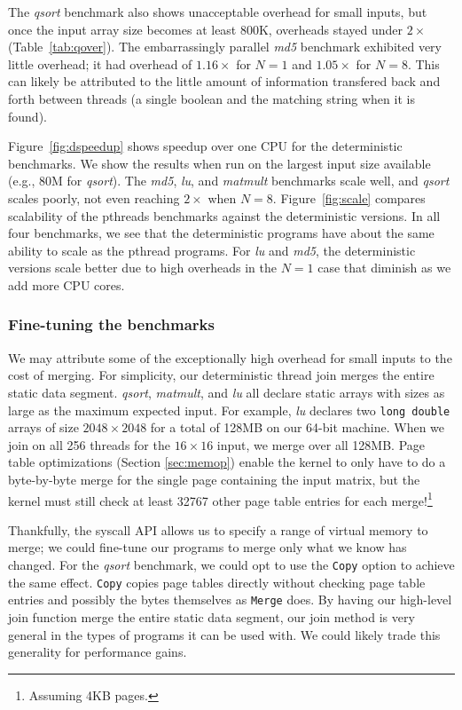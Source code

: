 The \emph{qsort} benchmark also shows unacceptable overhead for small inputs,
but once the input array size becomes at least 800K, overheads stayed under
$2\times$ (\mbox{Table \ref{tab:qover}}).
The embarrassingly parallel \emph{md5} benchmark exhibited very little overhead;
it had overhead of $1.16\times$ for $N=1$ and $1.05\times$ for $N=8$. This
can likely be attributed to the little amount of information transfered back and
forth between threads (a single boolean and the matching string when it is
found).

\mbox{Figure \ref{fig:dspeedup}} shows speedup over one CPU for the
deterministic benchmarks. We show the
results when run on the largest input size available
(e.g., 80M for \emph{qsort}). The \emph{md5}, \emph{lu}, and \emph{matmult}
benchmarks scale well, and \emph{qsort} scales poorly, not even
reaching $2\times$ when $N=8$. \mbox{Figure \ref{fig:scale}} compares
scalability of the pthreads benchmarks against the deterministic versions.
In all four benchmarks, we see that the deterministic programs have about the
same ability to scale as the pthread programs. For \emph{lu} and \emph{md5},
the deterministic versions scale better due to high overheads in the $N=1$
case that diminish as we add more CPU cores.

\subsubsection{Fine-tuning the benchmarks}
\label{sec:finetune}
We may attribute some of the exceptionally high overhead for small inputs to
the cost of merging. For simplicity, our deterministic thread join merges the
entire static data segment. \emph{qsort}, \emph{matmult}, and \emph{lu} all
declare static arrays with sizes as large as the maximum expected input. For
example, \emph{lu} declares two {\tt long double} arrays of size
$2048\times 2048$ for a total of 128MB on our 64-bit machine. When we join on
all 256 threads for the $16\times 16$ input, we merge over all 128MB. Page
table optimizations (Section \ref{sec:memop}) enable the kernel to only have to
do a \mbox{byte-by-byte} merge for the single page containing the input matrix,
but the kernel must still check at least 32767 other page table
entries for each merge!\footnote{Assuming 4KB pages.}

Thankfully, the syscall API allows us to specify a range of virtual memory to
merge; we could fine-tune our programs to merge only what we know has changed.
For the \emph{qsort} benchmark, we could opt to use the {\tt Copy} option to
achieve the same effect. {\tt Copy} copies page tables directly without checking
page table entries and possibly the bytes themselves as {\tt Merge} does. By
having our high-level join function merge the entire static data segment, our
join method is very general in the types of programs it can be used with. We
could likely trade this generality for performance gains.

